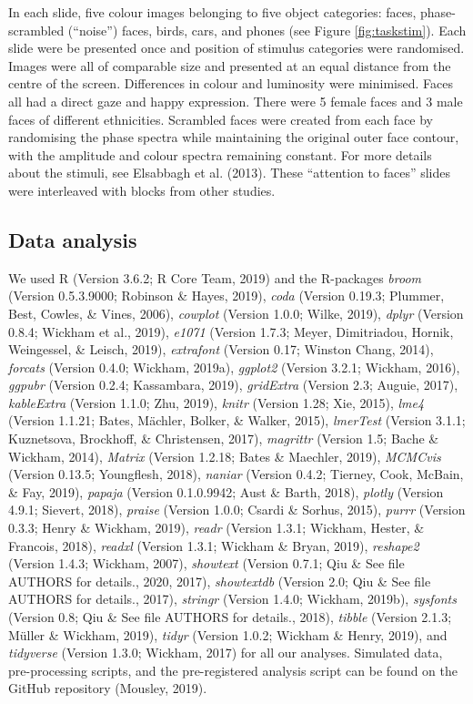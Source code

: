 \documentclass[english,man,floatsintext]{apa6}
\begin{document}
In each slide, five colour images belonging to five object categories: faces, phase-scrambled (\enquote{noise}) faces, birds, cars, and phones (see Figure \ref{fig:taskstim}). Each slide were be presented once and position of stimulus categories were randomised. Images were all of comparable size and presented at an equal distance from the centre of the screen. Differences in colour and luminosity were minimised. Faces all had a direct gaze and happy expression. There were 5 female faces and 3 male faces of different ethnicities. Scrambled faces were created from each face by randomising the phase spectra while maintaining the original outer face contour, with the amplitude and colour spectra remaining constant. For more details about the stimuli, see Elsabbagh et al. (2013). These \enquote{attention to faces} slides were interleaved with blocks from other studies.

\hypertarget{data-analysis}{%
\subsection{Data analysis}\label{data-analysis}}

We used R (Version 3.6.2; R Core Team, 2019) and the R-packages \emph{broom} (Version 0.5.3.9000; Robinson \& Hayes, 2019), \emph{coda} (Version 0.19.3; Plummer, Best, Cowles, \& Vines, 2006), \emph{cowplot} (Version 1.0.0; Wilke, 2019), \emph{dplyr} (Version 0.8.4; Wickham et al., 2019), \emph{e1071} (Version 1.7.3; Meyer, Dimitriadou, Hornik, Weingessel, \& Leisch, 2019), \emph{extrafont} (Version 0.17; Winston Chang, 2014), \emph{forcats} (Version 0.4.0; Wickham, 2019a), \emph{ggplot2} (Version 3.2.1; Wickham, 2016), \emph{ggpubr} (Version 0.2.4; Kassambara, 2019), \emph{gridExtra} (Version 2.3; Auguie, 2017), \emph{kableExtra} (Version 1.1.0; Zhu, 2019), \emph{knitr} (Version 1.28; Xie, 2015), \emph{lme4} (Version 1.1.21; Bates, Mächler, Bolker, \& Walker, 2015), \emph{lmerTest} (Version 3.1.1; Kuznetsova, Brockhoff, \& Christensen, 2017), \emph{magrittr} (Version 1.5; Bache \& Wickham, 2014), \emph{Matrix} (Version 1.2.18; Bates \& Maechler, 2019), \emph{MCMCvis} (Version 0.13.5; Youngflesh, 2018), \emph{naniar} (Version 0.4.2; Tierney, Cook, McBain, \& Fay, 2019), \emph{papaja} (Version 0.1.0.9942; Aust \& Barth, 2018), \emph{plotly} (Version 4.9.1; Sievert, 2018), \emph{praise} (Version 1.0.0; Csardi \& Sorhus, 2015), \emph{purrr} (Version 0.3.3; Henry \& Wickham, 2019), \emph{readr} (Version 1.3.1; Wickham, Hester, \& Francois, 2018), \emph{readxl} (Version 1.3.1; Wickham \& Bryan, 2019), \emph{reshape2} (Version 1.4.3; Wickham, 2007), \emph{showtext} (Version 0.7.1; Qiu \& See file AUTHORS for details., 2020, 2017), \emph{showtextdb} (Version 2.0; Qiu \& See file AUTHORS for details., 2017), \emph{stringr} (Version 1.4.0; Wickham, 2019b), \emph{sysfonts} (Version 0.8; Qiu \& See file AUTHORS for details., 2018), \emph{tibble} (Version 2.1.3; Müller \& Wickham, 2019), \emph{tidyr} (Version 1.0.2; Wickham \& Henry, 2019), and \emph{tidyverse} (Version 1.3.0; Wickham, 2017) for all our analyses. Simulated data, pre-processing scripts, and the pre-registered analysis script can be found on the GitHub repository (Mousley, 2019).
\end{document}
